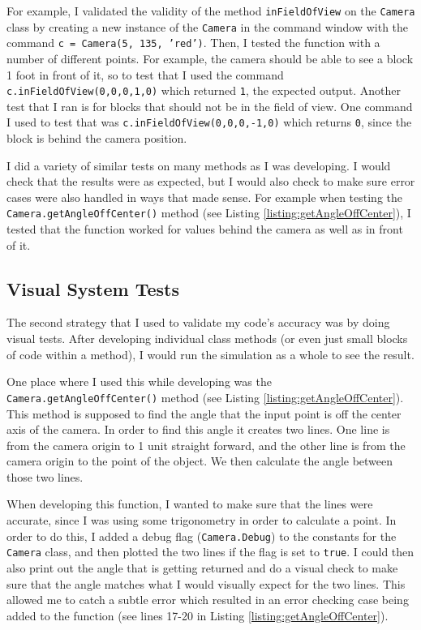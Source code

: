 \documentclass[12pt]{article}
\begin{document}
For example, I validated the validity of the method \texttt{inFieldOfView} on the \texttt{Camera} class by creating a new instance of the \texttt{Camera} in the command window with the command \texttt{c = Camera(5, 135, 'red')}. Then, I tested the function with a number of different points. For example, the camera should be able to see a block 1 foot in front of it, so to test that I used the command \texttt{c.inFieldOfView(0,0,0,1,0)} which returned \texttt{1}, the expected output. Another test that I ran is for blocks that should not be in the field of view. One command I used to test that was \texttt{c.inFieldOfView(0,0,0,-1,0)} which returns \texttt{0}, since the block is behind the camera position.

I did a variety of similar tests on many methods as I was developing. I would check that the results were as expected, but I would also check to make sure error cases were also handled in ways that made sense. For example when testing the \texttt{Camera.getAngleOffCenter()} method (see Listing \ref{listing:getAngleOffCenter}), I tested that the function worked for values behind the camera as well as in front of it.

\subsection{Visual System Tests}
The second strategy that I used to validate my code's accuracy was by doing visual tests. After developing individual class methods (or even just small blocks of code within a method), I would run the simulation as a whole to see the result.

One place where I used this while developing was the \texttt{Camera.getAngleOffCenter()} method (see Listing \ref{listing:getAngleOffCenter}). This method is supposed to find the angle that the input point is off the center axis of the camera. In order to find this angle it creates two lines. One line is from the camera origin to 1 unit straight forward, and the other line is from the camera origin to the point of the object. We then calculate the angle between those two lines.

When developing this function, I wanted to make sure that the lines were accurate, since I was using some trigonometry in order to calculate a point. In order to do this, I added a debug flag (\texttt{Camera.Debug}) to the constants for the \texttt{Camera} class, and then plotted the two lines if the flag is set to \texttt{true}. I could then also print out the angle that is getting returned and do a visual check to make sure that the  angle matches what I would visually expect for the two lines. This allowed me to catch a subtle error which resulted in an error checking case being added to the function (see lines 17-20 in Listing \ref{listing:getAngleOffCenter}).
\end{document}
